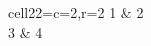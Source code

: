 \documentclass{article}
\begin{document}
\START

\begin{tblr}{
  cell{2}{2}={c=2,r=2}{}
}
  1 & 2 \\
  3 & 4 \\
\end{tblr}
\ENDTEST
\end{document}
